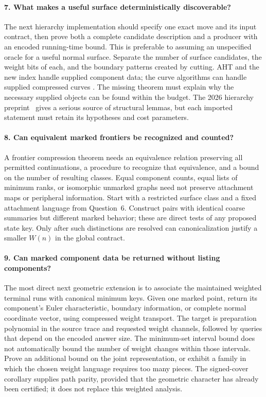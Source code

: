 \paragraph{7. What makes a useful surface deterministically discoverable?}
The next hierarchy implementation should specify one exact move and its
input contract, then prove both a complete candidate description and a
producer with an encoded running-time bound. This is preferable to
assuming an unspecified oracle for a useful normal surface. Separate the
number of surface candidates, the weight bits of each, and the boundary
patterns created by cutting. AHT and the new index handle supplied
component data; the curve algorithms can handle supplied compressed curves
\cite{aht,lackenby-curves}. The missing theorem must explain why the
necessary supplied objects can be found within the budget. The 2026
hierarchy preprint~\cite{lackenby-2026} gives a serious source of structural
lemmas, but each imported statement must retain its hypotheses and cost
parameters.

\paragraph{8. Can equivalent marked frontiers be recognized and counted?}
A frontier compression theorem needs an equivalence relation preserving
all permitted continuations, a procedure to recognize that equivalence,
and a bound on the number of resulting classes. Equal component counts,
equal lists of minimum ranks, or isomorphic unmarked graphs need not
preserve attachment maps or peripheral information. Start with a restricted
surface class and a fixed attachment language from Question~6. Construct
pairs with identical coarse summaries but different marked behavior; these
are direct tests of any proposed state key. Only after such distinctions
are resolved can canonicalization justify a smaller $W(n)$ in the global
contract.

\paragraph{9. Can marked component data be returned without listing components?}
The most direct next geometric extension is to associate the maintained
weighted terminal runs with canonical minimum keys. Given one marked
point, return its component's Euler characteristic, boundary information,
or complete normal coordinate vector, using compressed weight transport.
The target is preparation polynomial in the source trace and requested
weight channels, followed by queries that depend on the encoded answer
size. The minimum-set interval bound does not automatically bound the
number of weight changes within those intervals. Prove an additional
bound on the joint representation, or exhibit a family in which the
chosen weight language requires too many pieces. The signed-cover
corollary supplies path parity, provided that the geometric character
has already been certified; it does not replace this weighted analysis.

